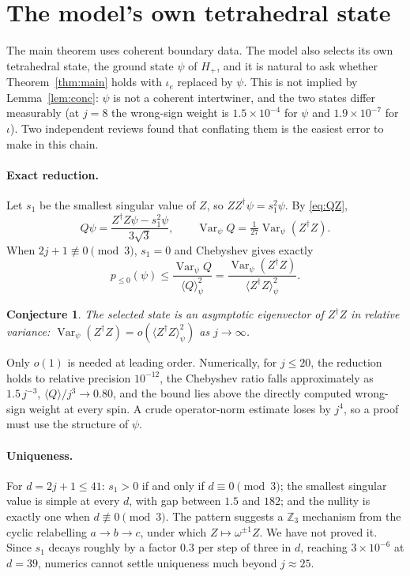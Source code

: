 \documentclass[11pt]{article}
\numberwithin{equation}{section}
\newtheorem{conjecture}[theorem]{Conjecture}
\theoremstyle{definition}
\theoremstyle{remark}
\begin{document}
\section{The model's own tetrahedral state}\label{sec:selected}

The main theorem uses coherent boundary data. The model also selects its own
tetrahedral state, the ground state $\psi$ of $H_+$, and it is natural to ask
whether Theorem~\ref{thm:main} holds with $\iota_e$ replaced by $\psi$. This is
not implied by Lemma~\ref{lem:conc}: $\psi$ is not a coherent intertwiner, and the
two states differ measurably (at $j=8$ the wrong-sign weight is
$1.5\times10^{-4}$ for $\psi$ and $1.9\times10^{-7}$ for $\iota$). Two independent
reviews found that conflating them is the easiest error to make in this chain.

\paragraph{Exact reduction.}
Let $s_1$ be the smallest singular value of $Z$, so $ZZ^\dagger\psi=s_1^2\psi$. By
\eqref{eq:QZ},
\[
Q\psi=\frac{Z^\dagger Z\psi-s_1^2\psi}{3\sqrt3},\qquad
\operatorname{Var}_\psi Q=\tfrac1{27}\operatorname{Var}_\psi(Z^\dagger Z).
\]
When $2j+1\not\equiv0\pmod3$, $s_1=0$ and Chebyshev gives exactly
\[
p_{\le0}(\psi)\le\frac{\operatorname{Var}_\psi Q}{\langle Q\rangle_\psi^2}
=\frac{\operatorname{Var}_\psi(Z^\dagger Z)}{\langle Z^\dagger Z\rangle_\psi^2}.
\]

\begin{conjecture}\label{conj:eig}
The selected state is an asymptotic eigenvector of $Z^\dagger Z$ in relative
variance: $\operatorname{Var}_\psi(Z^\dagger Z)=o(\langle Z^\dagger Z\rangle_\psi^2)$
as $j\to\infty$.
\end{conjecture}

Only $o(1)$ is needed at leading order. Numerically, for $j\le20$, the reduction
holds to relative precision $10^{-12}$, the Chebyshev ratio falls approximately
as $1.5\,j^{-3}$, $\langle Q\rangle/j^3\to0.80$, and the bound lies above the
directly computed wrong-sign weight at every spin. A crude operator-norm estimate
loses by $j^4$, so a proof must use the structure of $\psi$.

\paragraph{Uniqueness.}
For $d=2j+1\le41$: $s_1>0$ if and only if $d\equiv0\pmod3$; the smallest singular
value is simple at every $d$, with gap between $1.5$ and $182$; and the nullity is
exactly one when $d\not\equiv0\pmod3$. The pattern suggests a $\mathbb Z_3$
mechanism from the cyclic relabelling $a\to b\to c$, under which
$Z\mapsto\omega^{\pm1}Z$. We have not proved it. Since $s_1$ decays roughly by a
factor $0.3$ per step of three in $d$, reaching $3\times10^{-6}$ at $d=39$,
numerics cannot settle uniqueness much beyond $j\approx25$.
\end{document}
